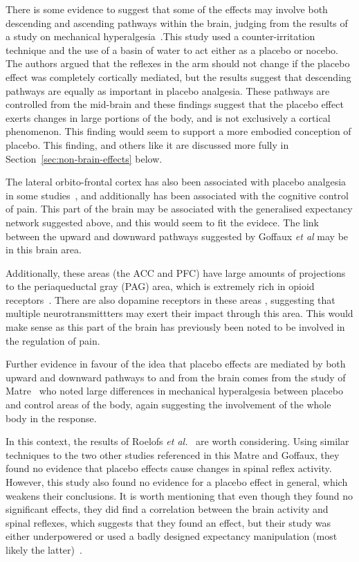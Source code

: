 There is some evidence to suggest that some of the effects may involve both descending and ascending pathways within the brain, judging from the results of a study on mechanical hyperalgesia~\cite{Goffaux2007}.This study used a counter-irritation technique and the use of a basin of water to act either as a placebo or nocebo. The authors argued that the reflexes in the arm should not change if the placebo effect was completely cortically mediated, but the results suggest that descending pathways are equally as important in placebo analgesia. These pathways are controlled from the mid-brain and these findings suggest that the placebo effect exerts changes in large portions of the body, and is not exclusively a cortical phenomenon. This finding would seem to support a more embodied conception of placebo. This finding, and others like it are discussed more fully in Section~\ref{sec:non-brain-effects} below.

The lateral orbito-frontal cortex has also been associated with placebo analgesia in some studies~\cite{Petrovic2002}, and additionally has been associated with the cognitive control of pain. This part of the brain may be associated with the generalised expectancy network suggested above, and this would seem to fit the evidece. The link between the upward and downward pathways suggested by Goffaux \textit{et al} may be in this brain area. 

Additionally, these areas (the ACC and PFC) have large amounts of projections to the periaqueductal gray (PAG) area, which is extremely rich in opioid receptors~\cite{Colloca2008a}. There are also dopamine receptors in these areas \cite{Fuente-Fernandez2004}, suggesting that multiple neurotransmittters may exert their impact through this area. This would make sense as this part of the brain has previously been noted to be involved in the regulation of pain. 

Further evidence in favour of the idea that placebo effects are mediated by both upward and downward pathways %
to and from the brain comes from the study of Matre~\cite{Matre2006a} who noted large differences in mechanical hyperalgesia between placebo and control areas of the body, again suggesting the involvement of the whole body in the response. 

In this context, the results of Roelofs \textit{et al.}~\cite{Roelofs2000} are worth considering. Using similar techniques to the two other studies referenced in this Matre and Goffaux, they found no evidence that placebo effects cause changes in spinal reflex activity. However, this study also found no evidence for a placebo effect in general, which weakens their conclusions. It is worth mentioning that even though they found no significant effects, they did find a correlation between the brain activity and spinal reflexes, which suggests that they found an effect, but their study was either underpowered or used a badly designed expectancy manipulation (most likely the latter)~\cite{Goffaux2007}.

